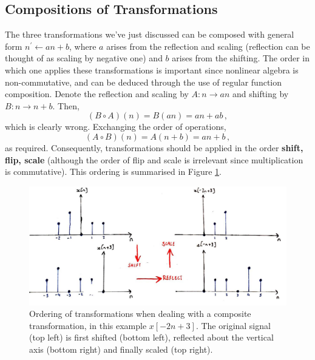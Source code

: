 \subsection{Compositions of Transformations}
%
The three transformations we've just discussed can be composed with general form
$n^\prime \leftarrow an + b$, where $a$ arises from the reflection and scaling (reflection
can be thought of as scaling by negative one) and $b$ arises from the shifting.
The order in which one applies these transformations is important since nonlinear algebra
is non-commutative, and can be deduced through the use of regular function composition.
Denote the reflection and scaling by $A: n\rightarrow an$ and shifting by
$B: n\rightarrow n+b$. Then,
%
\begin{displaymath}
  (B\circ A)(n) = B(an) = an + ab \,,
\end{displaymath}
%
which is clearly wrong. Exchanging the order of operations,
%
\begin{displaymath}
  (A\circ B)(n) = A(n + b) = an + b \,,
\end{displaymath}
%
as required. Consequently, transformations should be applied in the order
\textbf{shift, flip, scale} (although the order of flip and scale is irrelevant
since multiplication is commutative). This ordering is summarised in Figure
\ref{fig::lecture_1_transformation_order}.
%
\begin{figure}[H]
  \includegraphics[width=\textwidth]{images/lecture_1_transformation_order.JPG}
  \caption{
    Ordering of transformations when dealing with a composite transformation, in
    this example $x[-2n+3]$.
    The original signal (top left) is first shifted (bottom left), reflected
    about the vertical axis (bottom right) and finally scaled (top right).
  }
  \label{fig::lecture_1_transformation_order}
\end{figure}


